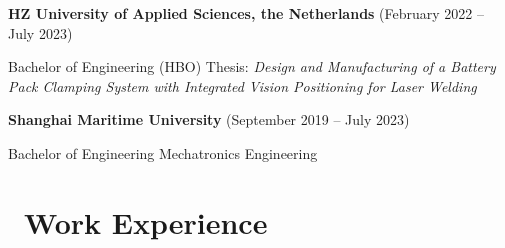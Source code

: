 \documentclass[11pt]{article}
\begin{document}
\textbf{HZ University of Applied Sciences, the Netherlands} (February 2022 -- July 2023)

\qquad Bachelor of Engineering (HBO)  
\quad Thesis: \emph{Design and Manufacturing of a Battery Pack Clamping System with Integrated Vision Positioning for Laser Welding}

\textbf{Shanghai Maritime University} (September 2019 -- July 2023)

\qquad Bachelor of Engineering \quad Mechatronics Engineering

\section{\makebox[\widthof{\faGraduationCap}][c]{\color{CVBlue}\faBriefcase}\ Work Experience}
\end{document}
